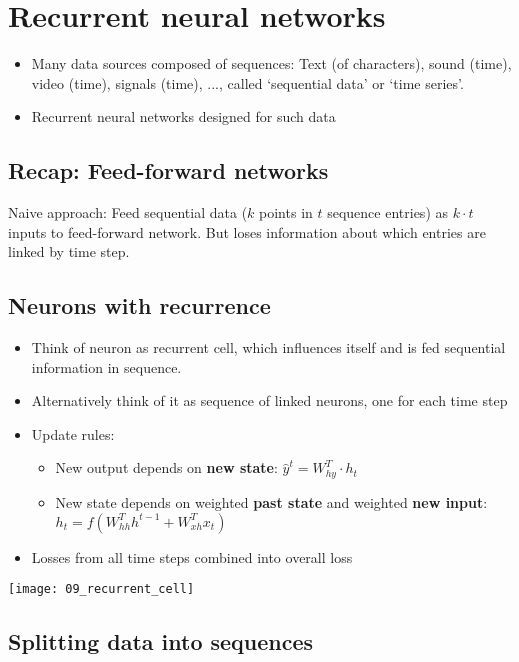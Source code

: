 \section{Recurrent neural networks}

\begin{itemize}
		\item Many data sources composed of sequences: Text (of characters),
				sound (time), video (time), signals (time), ..., called
				`sequential data' or `time series'.
		\item Recurrent neural networks designed for such data
\end{itemize}

\subsection{Recap: Feed-forward networks}

Naive approach: Feed sequential data ($k$ points in $t$ sequence entries) as $k
\cdot t$ inputs to feed-forward network. But loses information about which
entries are linked by time step.

\subsection{Neurons with recurrence}

\begin{itemize}
		\item Think of neuron as recurrent cell, which influences itself and is
				fed sequential information in sequence.
		\item Alternatively think of it as sequence of linked neurons, one for
				each time step
		\item Update rules:
				\begin{itemize}
						\item New output depends on \textbf{new state}:
								$\hat{y}^t = W^T_{hy} \cdot h_t$
						\item New state depends on weighted \textbf{past state}
								and weighted \textbf{new input}: $h_t =
								f(W^T_{hh} h^{t-1} + W^T_{xh} x_t)$
				\end{itemize}
		\item Losses from all time steps combined into overall loss
\end{itemize}

\texttt{[image: 09\_recurrent\_cell]}

\subsection{Splitting data into sequences}

